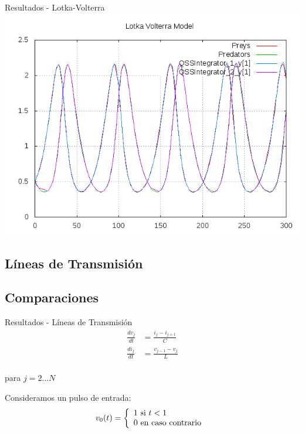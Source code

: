 \documentclass[10pt,presentation]{beamer}
\begin{document}
\begin{frame}{Resultados - Lotka-Volterra}
\includegraphics[width=\textwidth]{output/lotka_volterra/lotka_volterra-all.png}
\end{frame}

	\subsection{Líneas de Transmisión}
	\subsection{Comparaciones}

\begin{frame}{Resultados - Líneas de Transmisión}
\begin{equation*}
\begin{split}
\frac{d v_{j}}{d t} &= \frac{i_{j} - i_{j+1}}{C} \\
\frac{d i_{j}}{d t} &= \frac{v_{j-1} - v_{j}}{L} \\	
\end{split}
\end{equation*}

para $j = 2 \dots N$

Consideramos un pulso de entrada:
\begin{equation*}
v_0(t) = \left\{ 
  \begin{array}{l l}
    1 \text{ si } t < 1 \\
    0 \text{ en caso contrario }
  \end{array} \right.
\end{equation*}
\end{frame}
\end{document}

